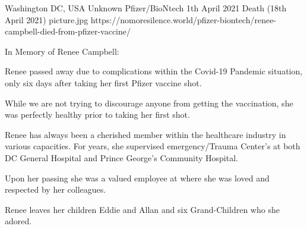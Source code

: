 {Washington DC, USA}
{Unknown}
{Pfizer/BioNtech}
{1th April 2021}
{Death (18th April 2021)}
{picture.jpg}
{https://nomoresilence.world/pfizer-biontech/renee-campbell-died-from-pfizer-vaccine/}
{

In Memory of Renee Campbell:

Renee passed away due to complications within the Covid-19 Pandemic situation,
only six days after taking her first Pfizer vaccine shot.

While we are not trying to discourage anyone from getting the vaccination, she
was perfectly healthy prior to taking her first shot.

Renee has always been a cherished member within the healthcare industry in
various capacities. For years, she supervised emergency/Trauma Center’s at both
DC General Hospital and Prince George’s Community Hospital.

Upon her passing she was a valued employee at where she was loved and respected
by her colleagues.

Renee leaves her children Eddie and Allan and six Grand-Children who she adored.

}
